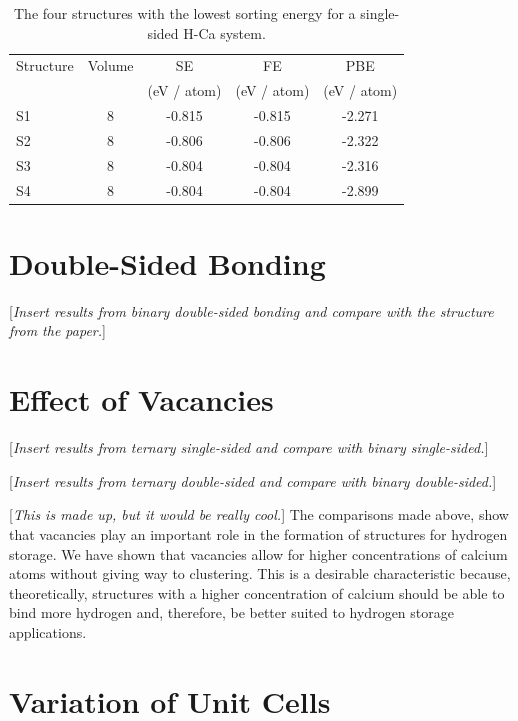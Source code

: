 \documentclass[oneside, noacknowlegments]{BYUPhys}
\begin{document}
\begin{table}
	\footnotesize
	\centering
	\begin{tabular}{lcccc}
	\hline
	\hline
	Structure & Volume & SE & FE & PBE \\
	& & (eV / atom) & (eV / atom) & (eV / atom) \\
	\hline
	S1 & 8 & -0.815 & -0.815 & -2.271 \\
	S2 & 8 & -0.806 & -0.806 & -2.322 \\
	S3 & 8 & -0.804 & -0.804 & -2.316 \\
	S4 & 8 & -0.804 & -0.804 & -2.899 \\
	\hline
	\hline
	\end{tabular}
	\caption{The four structures with the lowest sorting energy for 
		a single-sided H-Ca system.}
	\label{form_energy_tab}
\end{table}

\section{Double-Sided Bonding}

[\textit{Insert results from binary double-sided bonding and compare with the structure from the paper.}]

\section{Effect of Vacancies}

[\textit{Insert results from ternary single-sided and compare with binary single-sided.}]

[\textit{Insert results from ternary double-sided and compare with binary double-sided.}]

[\textit{This is made up, but it would be really cool.}] The comparisons made above, show that vacancies play an important role in the formation of structures for hydrogen storage. We have shown that vacancies allow for higher concentrations of calcium atoms without giving way to clustering. This is a desirable characteristic because, theoretically, structures with a higher concentration of calcium should be able to bind more hydrogen and, therefore, be better suited to hydrogen storage applications.

\section{Variation of Unit Cells}
\end{document}
